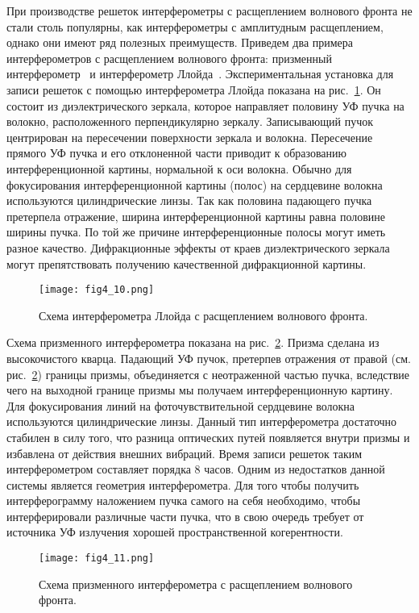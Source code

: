 При производстве решеток интерферометры с расщеплением волнового фронта не стали столь популярны, как интерферометры с амплитудным расщеплением, однако они имеют ряд полезных преимуществ. Приведем два примера интерферометров с расщеплением волнового фронта: призменный интерферометр~\cite{Kashyap90, Egglton94} и интерферометр Ллойда~\cite{Limberger93}. Экспериментальная установка для записи решеток с помощью интерферометра Ллойда показана на рис.~\ref{fig4.10}. Он состоит из диэлектрического зеркала, которое направляет половину УФ пучка на волокно, расположенного перпендикулярно зеркалу. Записывающий пучок центрирован на пересечении поверхности зеркала и волокна. Пересечение прямого УФ пучка и его отклоненной части приводит к образованию интерференционной картины, нормальной к оси волокна. Обычно для фокусирования интерференционной картины (полос) на сердцевине волокна используются цилиндрические линзы. Так как половина падающего пучка претерпела отражение, ширина интерференционной картины равна половине ширины пучка. По той же причине интерференционные полосы могут иметь разное качество. Дифракционные эффекты от краев диэлектрического зеркала могут препятствовать получению качественной дифракционной картины.

\begin{figure}
\centering
\texttt{[image: fig4\_10.png]}
\caption{Схема интерферометра Ллойда с расщеплением волнового фронта.}\label{fig4.10}
\end{figure}

Схема призменного интерферометра показана на рис.~\ref{fig4.11}. Призма сделана из высокочистого кварца. Падающий УФ пучок, претерпев отражения от правой (см. рис.~\ref{fig4.11}) границы призмы, объединяется с неотраженной частью пучка, вследствие чего на выходной границе призмы мы получаем интерференционную картину. Для фокусирования линий на фоточувствительной сердцевине волокна используются цилиндрические линзы. Данный тип интерферометра достаточно стабилен в силу того, что разница оптических путей появляется внутри призмы и избавлена от действия внешних вибраций. Время записи решеток таким интерферометром составляет порядка 8 часов. Одним из недостатков данной системы является геометрия интерферометра. Для того чтобы получить интерферограмму наложением пучка самого на себя необходимо, чтобы интерферировали различные части пучка, что в свою очередь требует от источника УФ излучения хорошей пространственной когерентности.

\begin{figure}
\centering
\texttt{[image: fig4\_11.png]}
\caption{Схема призменного интерферометра с расщеплением волнового фронта.}\label{fig4.11}
\end{figure}

